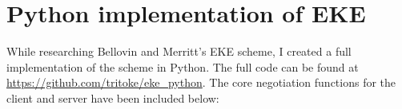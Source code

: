 \chapter{Python implementation of EKE}

While researching Bellovin and Merritt's EKE scheme\cite{eke}, I created a full implementation of the scheme in Python.
The full code can be found at \url{https://github.com/tritoke/eke_python}.
The core negotiation functions for the client and server have been included below:


